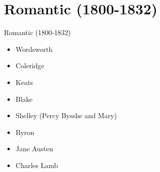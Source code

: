 \documentclass[
  12pt,
  ignorenonframetext,
  progressbar=frametitle]{beamer}
\providecommand{\tightlist}{%
  \setlength{\itemsep}{0pt}\setlength{\parskip}{0pt}}
\begin{document}
\section{Romantic (1800-1832)}
\begin{frame}[allowframebreaks]
{Romantic (1800-1832)}
\begin{itemize}
\tightlist
\item
  Wordsworth
\item
  Coleridge
\item
  Keats
\item
  Blake
\item
  Shelley (Percy Bysshe and Mary)
\item
  Byron
\item
  Jane Austen
\item
  Charles Lamb
\end{itemize}
\end{frame}
\end{document}
